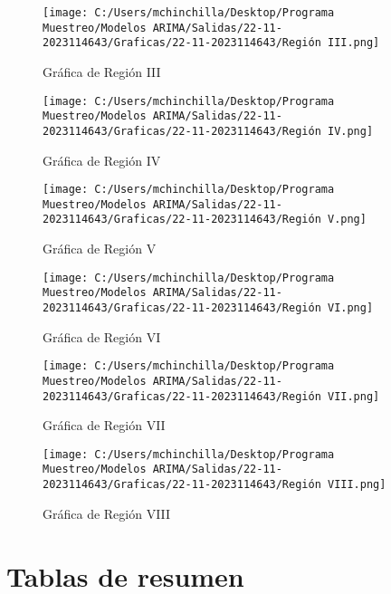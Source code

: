 \documentclass{article}%
\begin{document}
%


\begin{figure}[H]%
\centering%
\texttt{[image: C:/Users/mchinchilla/Desktop/Programa Muestreo/Modelos ARIMA/Salidas/22-11-2023114643/Graficas/22-11-2023114643/Región III.png]}%
\caption{Gráfica de Región III}%
\end{figure}

%


\begin{figure}[H]%
\centering%
\texttt{[image: C:/Users/mchinchilla/Desktop/Programa Muestreo/Modelos ARIMA/Salidas/22-11-2023114643/Graficas/22-11-2023114643/Región IV.png]}%
\caption{Gráfica de Región IV}%
\end{figure}

%


\begin{figure}[H]%
\centering%
\texttt{[image: C:/Users/mchinchilla/Desktop/Programa Muestreo/Modelos ARIMA/Salidas/22-11-2023114643/Graficas/22-11-2023114643/Región V.png]}%
\caption{Gráfica de Región V}%
\end{figure}

%


\begin{figure}[H]%
\centering%
\texttt{[image: C:/Users/mchinchilla/Desktop/Programa Muestreo/Modelos ARIMA/Salidas/22-11-2023114643/Graficas/22-11-2023114643/Región VI.png]}%
\caption{Gráfica de Región VI}%
\end{figure}

%


\begin{figure}[H]%
\centering%
\texttt{[image: C:/Users/mchinchilla/Desktop/Programa Muestreo/Modelos ARIMA/Salidas/22-11-2023114643/Graficas/22-11-2023114643/Región VII.png]}%
\caption{Gráfica de Región VII}%
\end{figure}

%


\begin{figure}[H]%
\centering%
\texttt{[image: C:/Users/mchinchilla/Desktop/Programa Muestreo/Modelos ARIMA/Salidas/22-11-2023114643/Graficas/22-11-2023114643/Región VIII.png]}%
\caption{Gráfica de Región VIII}%
\end{figure}

%
\section{Tablas de resumen}%
\label{sec:Tablasderesumen}%
\end{document}
